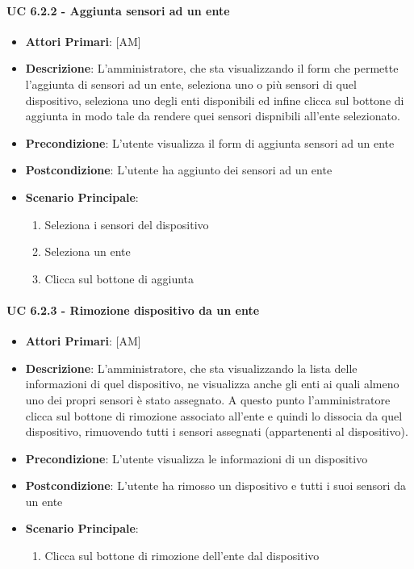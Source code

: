 			\paragraph{UC 6.2.2 - Aggiunta sensori ad un ente}
			\begin{itemize}
				\item \textbf{Attori Primari}: [AM]
				\item \textbf{Descrizione}: L'amministratore, che sta visualizzando il form che permette l'aggiunta di sensori ad un ente, seleziona uno o più sensori di quel dispositivo, seleziona uno degli enti disponibili ed infine clicca sul bottone di aggiunta in modo tale da rendere quei sensori dispnibili all'ente selezionato.
				\item \textbf{Precondizione}: L'utente visualizza il form di aggiunta sensori ad un ente
				\item \textbf{Postcondizione}: L'utente ha aggiunto dei sensori ad un ente
				\item \textbf{Scenario Principale}:
				\begin{enumerate}
					\item{Seleziona i sensori del dispositivo}
					\item{Seleziona un ente}
					\item{Clicca sul bottone di aggiunta}
				\end{enumerate}	
			\end{itemize}

			\paragraph{UC 6.2.3 - Rimozione dispositivo da un ente}
			\begin{itemize}
				\item \textbf{Attori Primari}: [AM]
				\item \textbf{Descrizione}: L'amministratore, che sta visualizzando la lista delle informazioni di quel dispositivo, ne visualizza anche gli enti ai quali almeno uno dei propri sensori è stato assegnato. A questo punto l'amministratore clicca sul bottone di rimozione associato all'ente e quindi lo dissocia da quel dispositivo, rimuovendo tutti i sensori assegnati (appartenenti al dispositivo).
				\item \textbf{Precondizione}: L'utente visualizza le informazioni di un dispositivo
				\item \textbf{Postcondizione}: L'utente ha rimosso un dispositivo e tutti i suoi sensori da un ente
				\item \textbf{Scenario Principale}:
				\begin{enumerate}
					\item{Clicca sul bottone di rimozione dell'ente dal dispositivo}
				\end{enumerate}	
			\end{itemize}

